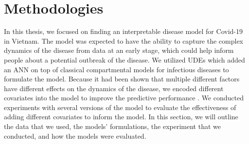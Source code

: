 \chapter{Methodologies}
\label{chap:methodologies}

In this thesis, we focused on finding an interpretable disease model for Covid-19 in Vietnam.
The model was expected to have the ability to capture the complex dynamics of the disease from data at an early stage, which could help inform people about a potential outbreak of the disease.
We utilized \glspl{UDE} which added an \gls{ANN} on top of classical compartmental models for infectious diseases to formulate the model.
Because it had been shown that multiple different factors have different effects on the dynamics of the disease, we encoded different covariates into the model to improve the predictive performance \cite{ihmecovid-19forecastingteamModelingCOVID19Scenarios2021,arikInterpretableSequenceLearning}.
We conducted experiments with several versions of the model to evaluate the effectiveness of adding different covariates to inform the model.
In this section, we will outline the data that we used, the models' formulations, the experiment that we conducted, and how the models were evaluated.











